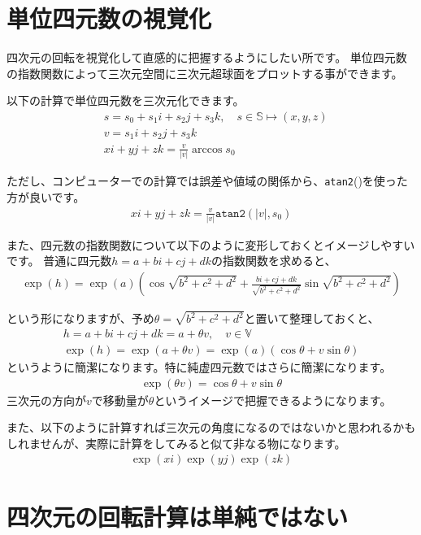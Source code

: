 \documentclass[a4paper,12pt,notitlepage]{jsreport}
\begin{document}
\section{単位四元数の視覚化}

四次元の回転を視覚化して直感的に把握するようにしたい所です。
単位四元数の指数関数によって三次元空間に三次元超球面をプロットする事ができます。

以下の計算で単位四元数を三次元化できます。
\begin{equation}
\begin{split}
&s=s_0+s_1i+s_2j+s_3k,\quad s\in\mathbb{S}\mapsto (x,y,z)\\
&v=s_1i+s_2j+s_3k\\
&xi+yj+zk=\frac{v}{|v|}\arccos s_0
\end{split}
\end{equation}

ただし、コンピューターでの計算では誤差や値域の関係から、\texttt{atan2}()を使った方が良いです。
\begin{gather}
xi+yj+zk=\frac{v}{|v|}\texttt{atan2}(|v|, s_0)
\end{gather}

また、四元数の指数関数について以下のように変形しておくとイメージしやすいです。
普通に四元数$h=a+bi+cj+dk$の指数関数を求めると、
\begin{gather}
\exp(h)=\exp(a)\left(\cos\sqrt{b^2+c^2+d^2}+\frac{bi+cj+dk}{\sqrt{b^2+c^2+d^2}}\sin\sqrt{b^2+c^2+d^2}\right)
\end{gather}

という形になりますが、予め$\theta=\sqrt{b^2+c^2+d^2}$と置いて整理しておくと、
\begin{gather}
h=a+bi+cj+dk=a+\theta v,\quad v\in\mathbb{V}\\
\exp(h)=\exp(a+\theta v)=\exp(a)(\cos \theta+v\sin\theta)
\end{gather}
というように簡潔になります。特に純虚四元数ではさらに簡潔になります。
\begin{gather}
\exp(\theta v)=\cos \theta+v\sin\theta
\end{gather}
三次元の方向が$v$で移動量が$\theta$というイメージで把握できるようになります。

また、以下のように計算すれば三次元の角度になるのではないかと思われるかもしれませんが、実際に計算をしてみると似て非なる物になります。
\begin{gather}
\exp(xi)\exp(yj)\exp(zk)
\end{gather}

\section{四次元の回転計算は単純ではない}
\end{document}
